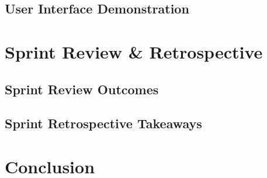 \subsection{User Interface Demonstration}
\label{subsec:ch5_ui_screenshots}

\section{Sprint Review \& Retrospective}
\label{sec:ch5_review_retro}
\subsection{Sprint Review Outcomes}
\label{subsec:ch5_review}

\subsection{Sprint Retrospective Takeaways}
\label{subsec:ch5_retro}

\section{Conclusion}
\label{sec:ch5_conclusion}
